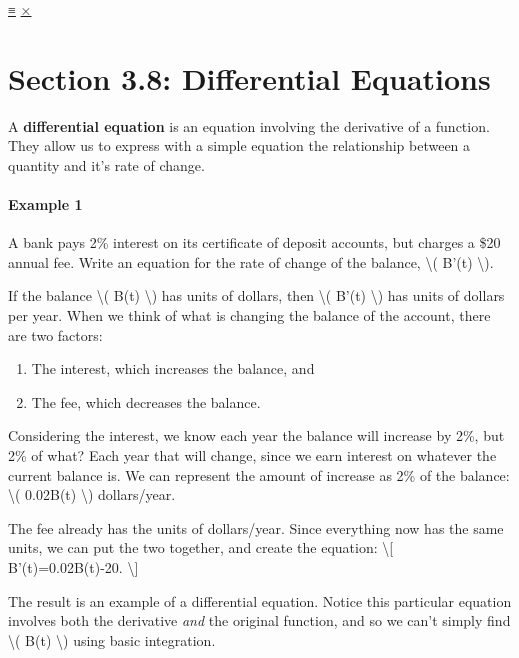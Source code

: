 \protect\hyperlink{main-nav}{≡} \protect\hyperlink{close-nav}{×}

\hypertarget{section-3.8-differential-equations}{%
\section{Section 3.8: Differential
Equations}\label{section-3.8-differential-equations}}

A \textbf{differential equation} is an equation involving the derivative
of a function. They allow us to express with a simple equation the
relationship between a quantity and it's rate of change.

\hypertarget{example-1}{%
\paragraph{Example 1}\label{example-1}}

A bank pays 2\% interest on its certificate of deposit accounts, but
charges a \$20 annual fee. Write an equation for the rate of change of
the balance, \textbackslash{}( B'(t) \textbackslash{}).

If the balance \textbackslash{}( B(t) \textbackslash{}) has units of
dollars, then \textbackslash{}( B'(t) \textbackslash{}) has units of
dollars per year. When we think of what is changing the balance of the
account, there are two factors:

\begin{enumerate}
\tightlist
\item
  The interest, which increases the balance, and
\item
  The fee, which decreases the balance.
\end{enumerate}

Considering the interest, we know each year the balance will increase by
2\%, but 2\% of what? Each year that will change, since we earn interest
on whatever the current balance is. We can represent the amount of
increase as 2\% of the balance: \textbackslash{}( 0.02B(t)
\textbackslash{}) dollars/year.

The fee already has the units of dollars/year. Since everything now has
the same units, we can put the two together, and create the equation:
\textbackslash{}{[} B'(t)=0.02B(t)-20. \textbackslash{}{]}

The result is an example of a differential equation. Notice this
particular equation involves both the derivative \emph{and} the original
function, and so we can't simply find \textbackslash{}( B(t)
\textbackslash{}) using basic integration.


